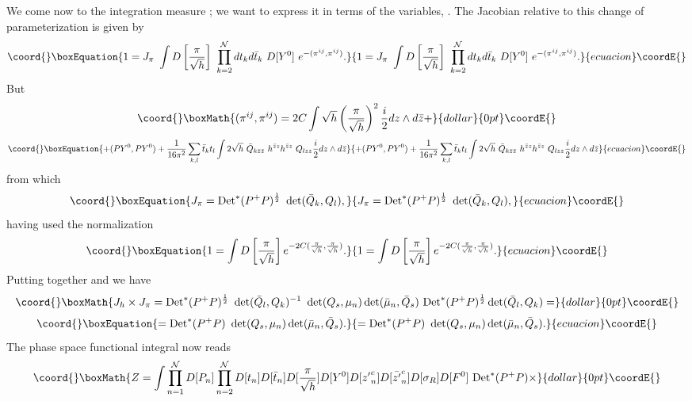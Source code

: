 \documentclass[a4paper,12pt]{article}
\begin{document}
We come now to the integration measure \coordHE{}; we want to
express it in terms of the variables, \coordHE{}. The Jacobian relative to this change of
parameterization is given by 
\begin{equation}\coord{}\boxEquation{
1=J_{\pi}~\int D\left[\frac{\pi}{\sqrt h}\right]~ \prod_{k=2}^{\cal N}
dt_k d\bar t_k~ 
D[Y^0]~ e^{-(\pi^{ij}, \pi^{ij}) }.
}{
1=J_{\pi}~\int D\left[\frac{\pi}{\sqrt h}\right]~ \prod_{k=2}^{\cal N}
dt_k d\bar t_k~ 
D[Y^0]~ e^{-(\pi^{ij}, \pi^{ij}) }.
}{ecuacion}\coordE{}\end{equation}
But 
$$\coord{}\boxMath{
(\pi^{ij}, \pi^{ij}) = 2C\int \sqrt h \left(\frac{\pi}{\sqrt h}\right)^2
\frac{i}{2} dz\wedge d\bar z +
}{dollar}{0pt}\coordE{}$$
\begin{equation}\coord{}\boxEquation{
+(PY^0, PY^0)+ \frac{1}{16\pi^2}\sum_{k,l} \bar t_k t_l\int 2 \sqrt{h}~\bar
Q_{k\bar z\bar z}~h^{\bar z z}h^{\bar z z}~ Q_{lzz} \frac{i}{2} dz\wedge
d\bar z
}{
+(PY^0, PY^0)+ \frac{1}{16\pi^2}\sum_{k,l} \bar t_k t_l\int 2 \sqrt{h}~\bar
Q_{k\bar z\bar z}~h^{\bar z z}h^{\bar z z}~ Q_{lzz} \frac{i}{2} dz\wedge
d\bar z
}{ecuacion}\coordE{}\end{equation}
from which 
\begin{equation}\coord{}\boxEquation{
J_\pi = {\rm Det}^*(P^+P)^{\frac{1}{2}}~\det(\bar Q_k, Q_l ),
}{
J_\pi = {\rm Det}^*(P^+P)^{\frac{1}{2}}~\det(\bar Q_k, Q_l ),
}{ecuacion}\coordE{}\end{equation}
having used the normalization
\begin{equation}\coord{}\boxEquation{
1= \int D\left[\frac{\pi}{\sqrt h}\right]
e^{-2C(\frac{\pi}{\sqrt h},\frac{\pi}{\sqrt h})}.
}{
1= \int D\left[\frac{\pi}{\sqrt h}\right]
e^{-2C(\frac{\pi}{\sqrt h},\frac{\pi}{\sqrt h})}.
}{ecuacion}\coordE{}\end{equation}
Putting together \coordHE{} and \coordHE{} we have
$$\coord{}\boxMath{
J_h \times J_\pi = {\rm Det}^*(P^+P)^{\frac{1}{2}}~ \det(\bar Q_l,
Q_k)^{-1}~ \det(Q_s, \mu_n)\det(\bar \mu_n, \bar Q_s)~ {\rm
Det}^*(P^+P)^{\frac{1}{2}} \det(\bar Q_l, Q_k)=
}{dollar}{0pt}\coordE{}$$
\begin{equation}\coord{}\boxEquation{
= {\rm Det}^*(P^+P)~\det(Q_s, \mu_n)\det(\bar \mu_n, \bar Q_s).
}{
= {\rm Det}^*(P^+P)~\det(Q_s, \mu_n)\det(\bar \mu_n, \bar Q_s).
}{ecuacion}\coordE{}\end{equation}
The phase space functional integral now reads
$$\coord{}\boxMath{
Z= \int\prod_{n=1}^{\cal N}D[P_n]
\prod_{n=2}^{\mathcal{N}}D[t_n]D[\bar t_n]D[\frac{\pi}{\sqrt
h}]D[Y^0]D[{z'}^c_n]D[\bar{z'}^c_n] 
D[\sigma_R]D[F^0]~{\rm Det}^*(P^+P)\times
}{dollar}{0pt}\coordE{}$$
\end{document}
